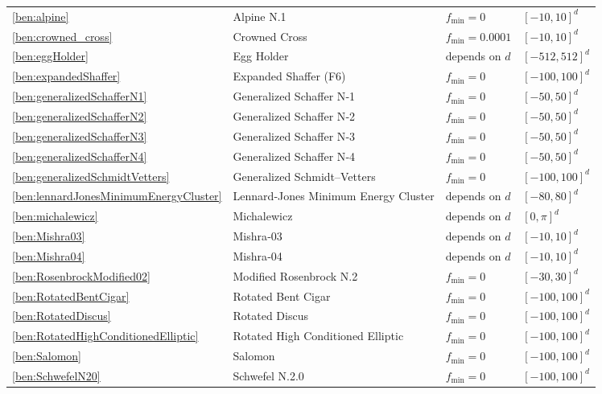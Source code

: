 {\begin{longtable}[c]{p{0.8cm}p{6.4cm}ll}
\eqref{ben:alpine} & Alpine N.1  & $f_{\min}=0$ & $[-10,10]^d$ \\
\eqref{ben:crowned_cross} & Crowned Cross   & $f_{\min}=0.0001$ & $[-10,10]^d$ \\
\eqref{ben:eggHolder} & Egg Holder   & depends on $d$ & $[-512,512]^d$ \\
\eqref{ben:expandedShaffer} & Expanded Shaffer (F6)  & $f_{\min}=0$ & $[-100,100]^d$ \\
\eqref{ben:generalizedSchafferN1} & Generalized Schaffer N‑1  & $f_{\min}=0$ & $[-50,50]^d$ \\
\eqref{ben:generalizedSchafferN2}  & Generalized Schaffer N‑2   & $f_{\min}=0$ & $[-50,50]^d$ \\
\eqref{ben:generalizedSchafferN3}  & Generalized Schaffer N‑3  & $f_{\min}=0$ & $[-50,50]^d$ \\
\eqref{ben:generalizedSchafferN4}  & Generalized Schaffer N‑4 & $f_{\min}=0$ & $[-50,50]^d$ \\
\eqref{ben:generalizedSchmidtVetters} & Generalized Schmidt–Vetters & $f_{\min}=0$ & $[-100,100]^d$ \\
\eqref{ben:lennardJonesMinimumEnergyCluster} & Lennard‑Jones Minimum Energy Cluster & depends on $d$ & $[-80,80]^d$ \\
\eqref{ben:michalewicz} & Michalewicz & depends on $d$ & $[0,\pi]^d$ \\
\eqref{ben:Mishra03} & Mishra‑03 & depends on $d$ & $[-10,10]^d$ \\
\eqref{ben:Mishra04}  & Mishra‑04 & depends on $d$ & $[-10,10]^d$ \\
\eqref{ben:RosenbrockModified02} & Modified Rosenbrock N.2 & $f_{\min}=0$ & $[-30,30]^d$ \\
\eqref{ben:RotatedBentCigar} & Rotated Bent Cigar & $f_{\min}=0$ & $[-100,100]^d$ \\
\eqref{ben:RotatedDiscus} & Rotated Discus & $f_{\min}=0$ & $[-100,100]^d$ \\
\eqref{ben:RotatedHighConditionedElliptic} & Rotated High Conditioned Elliptic & $f_{\min}=0$ & $[-100,100]^d$ \\
\eqref{ben:Salomon} & Salomon & $f_{\min}=0$ & $[-100,100]^d$ \\
\eqref{ben:SchwefelN20} & Schwefel N.2.0 & $f_{\min}=0$ & $[-100,100]^d$ \\

\end{longtable}}

